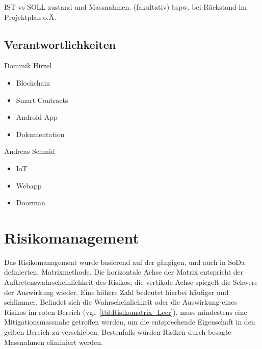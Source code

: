 IST vs SOLL zustand und Massnahmen. (fakultativ)
bspw. bei Rückstand im Projektplan o.Ä.


\subsection{Verantwortlichkeiten}
Dominik Hirzel
\begin{itemize}
    \item Blockchain
    \item Smart Contracts
    \item Android App
    \item Dokumentation
\end{itemize}

Andreas Schmid
\begin{itemize}
    \item IoT
    \item Webapp
    \item Doorman
\end{itemize}


\section{Risikomanagement}
Das Risikomanagement wurde basierend auf der gängigen, und auch in SoDa definierten, Matrixmethode. Die horizontale Achse der Matrix entspricht der Auftretenswahrscheinlichkeit des Risikos, die vertikale Achse spiegelt die Schwere der Auswirkung wieder. Eine höhere Zahl bedeutet hierbei häufiger und schlimmer. Befindet sich die Wahrscheinlichkeit oder die Auswirkung eines Risikos im roten Bereich (vgl. \ref{tbl:Risikomatrix_Leer}), muss mindestens eine Mitigationsmassnahe getroffen werden, um die entsprechende Eigenschaft in den gelben Bereich zu verschieben. Bestenfalls würden Risiken durch besagte Massnahmen eliminiert werden.

